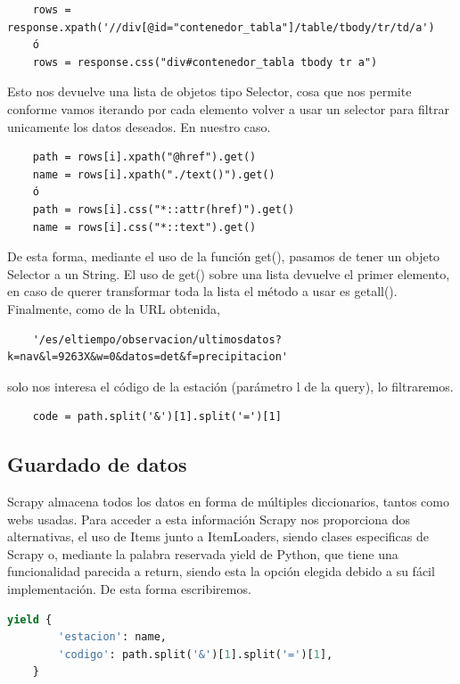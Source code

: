 \begin{verbatim}
	rows = response.xpath('//div[@id="contenedor_tabla"]/table/tbody/tr/td/a')
	ó
	rows = response.css("div#contenedor_tabla tbody tr a")
\end{verbatim}

Esto nos devuelve una lista de objetos tipo Selector, cosa que nos permite conforme vamos iterando por cada elemento volver a usar un selector para filtrar unicamente los datos deseados. En nuestro caso.

\begin{verbatim}
	path = rows[i].xpath("@href").get()
	name = rows[i].xpath("./text()").get()
	ó
	path = rows[i].css("*::attr(href)").get()
	name = rows[i].css("*::text").get()
\end{verbatim}

De esta forma, mediante el uso de la función get(), pasamos de tener un objeto Selector a un String. El uso de get() sobre una lista devuelve el primer elemento, en caso de querer transformar toda la lista el método a usar es getall().\newline
\newline
Finalmente, como de la URL obtenida,

\begin{verbatim}
	'/es/eltiempo/observacion/ultimosdatos?k=nav&l=9263X&w=0&datos=det&f=precipitacion'
\end{verbatim}

solo nos interesa el código de la estación (parámetro l de la query), lo filtraremos.

\begin{verbatim}
	code = path.split('&')[1].split('=')[1]
\end{verbatim}

\subsection{Guardado de datos}
Scrapy almacena todos los datos en forma de múltiples diccionarios, tantos como webs usadas. Para acceder a esta información Scrapy nos proporciona dos alternativas, el uso de Items junto a ItemLoaders, siendo clases especificas de Scrapy o, mediante la palabra reservada yield de Python, que tiene una funcionalidad parecida a return, siendo esta la opción elegida debido a su fácil implementación.\newline
\newline
De esta forma escribiremos.

\begin{lstlisting}[language=Python, caption={Guardar datos}]
	yield {
		'estacion': name,
		'codigo': path.split('&')[1].split('=')[1],
	}
\end{lstlisting}

